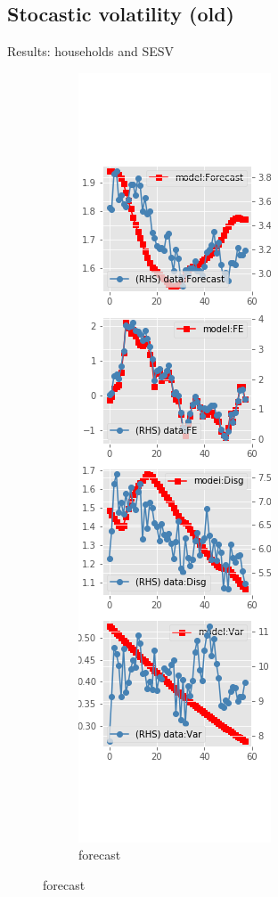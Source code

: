 \documentclass{beamer}
\begin{document}


\subsection{Stocastic volatility (old)}


\begin{frame}{Results: households and SESV}
	\begin{figure}[ht]
		\label{SESV_diag_SCE}
		\begin{subfigure}[b]{0.19\textwidth}
			\centering
			\caption{forecast}
			\includegraphics[width=\textwidth, height = 0.8\textheight]{figuresDraft/sce_se_est_sv_diag0.png}

\end{subfigure}
\end{figure}
\end{frame}
\end{document}
